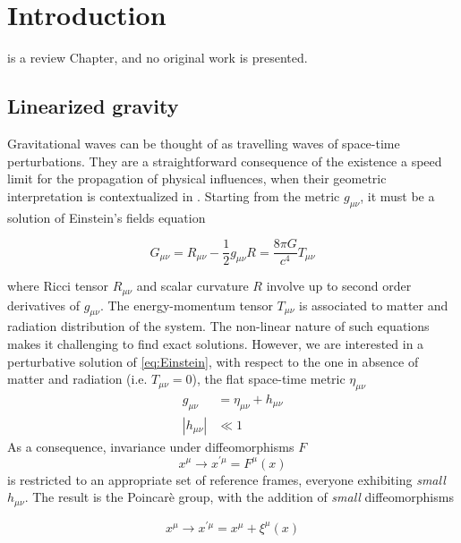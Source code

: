 \chapter[Introduction]{Introduction\\
}
\label{ch:introduction}

 is a review Chapter, and no original work is presented.

\section{Linearized gravity\label{sec:LinGra}}

Gravitational waves can be thought of as travelling waves of space-time perturbations.
They are a straightforward consequence of the existence a speed limit for the propagation of physical influences, when their geometric interpretation is contextualized in \gr. 
Starting from the metric $g_{\mu\nu}$, it must be a solution of Einstein's fields equation \cite{Einstein:1913:EVRb}

\begin{equation}
	G_{\mu\nu}=R_{\mu\nu}-\frac{1}{2}g_{\mu\nu}R=\frac{8\pi G}{c^{4}}T_{\mu\nu}\label{eq:Einstein}
\end{equation}

where Ricci tensor $R_{\mu\nu}$ and scalar curvature $R$ involve up to second order derivatives of $g_{\mu\nu}$.
The energy-momentum tensor $T_{\mu\nu}$ is associated to matter and radiation distribution of the system. The non-linear nature of such equations makes it challenging to find exact solutions.
However, we are interested in a perturbative solution of \eqref{eq:Einstein}, with respect to the one in absence of matter and radiation (i.e. $T_{\mu\nu}=0$), the flat space-time metric $\eta_{\mu\nu}$
\begin{align}
	g_{\mu\nu} & =\eta_{\mu\nu}+h_{\mu\nu} \label{eq:hdefinition}\\
	\left|h_{\mu\nu}\right| & \ll1
\end{align}
As a consequence, \gr invariance under diffeomorphisms $F$
\begin{equation}
x^{\mu}\rightarrow x^{\prime\mu}=F^{\mu}\left(x\right)
\end{equation}
is restricted to an appropriate set of reference frames, everyone exhibiting \emph{small} $h_{\mu\nu}$. 
The result is the Poincarè group, with the addition of \emph{small} diffeomorphisms

\begin{equation}
	x^{\mu}\rightarrow x^{\prime\mu}=x^{\mu}+\xi^{\mu}\left(x\right) \label{eq:linEE_invariance}
\end{equation}

